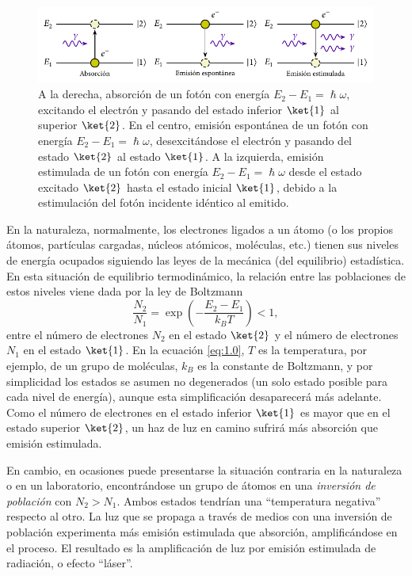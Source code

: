 \begin{figure}[htbp]
  \centering
  \includegraphics[width=\textwidth]{Figuras/ch1_rad_mat.pdf}
  \caption{A la derecha, absorción de un fotón con energía $E_{2} - E_{1} = \hslash \omega$, excitando el electrón y pasando del estado inferior $\ket{1}$ al superior $\ket{2}$. En el centro, emisión espontánea de un fotón con energía $E_{2}-E_{1}=\hslash \omega$, desexcitándose el electrón y pasando del estado $\ket{2}$ al estado $\ket{1}$. A la izquierda, emisión estimulada de un fotón con energía $E_{2}-E_{1}=\hslash \omega$ desde el estado excitado $\ket{2}$ hasta el estado inicial $\ket{1}$, debido a la estimulación del fotón incidente idéntico al emitido.}
  \label{fig:1.2}
\end{figure}

En la naturaleza, normalmente, los electrones ligados a un átomo (o los propios átomos, partículas cargadas, núcleos atómicos, moléculas, etc.) tienen sus niveles de energía ocupados siguiendo las leyes de la mecánica (del equilibrio) estadística. En esta situación de equilibrio termodinámico, la relación entre las poblaciones de estos niveles viene dada por la ley de Boltzmann \autocite{Feynman2011}
\begin{equation}\label{eq:1.0}
  \frac{N_{2}}{N_{1}} = \exp \left(-\frac{E_{2}-E_{1}}{k_{B}T}\right) < 1, 
\end{equation}
entre el número de electrones $N_{2}$ en el estado $\ket{2}$ y el número de electrones $N_{1}$ en el estado $\ket{1}$. En la ecuación \eqref{eq:1.0}, $T$ es la temperatura, por ejemplo, de un grupo de moléculas, $k_{B}$ es la constante de Boltzmann, y por simplicidad los estados se asumen no degenerados (un solo estado posible para cada nivel de energía), aunque esta simplificación desaparecerá más adelante. Como el número de electrones en el estado inferior $\ket{1}$ es mayor que en el estado superior $\ket{2}$, un haz de luz en camino sufrirá más absorción que emisión estimulada.

En cambio, en ocasiones puede presentarse la situación contraria en la naturaleza o en un laboratorio, encontrándose un grupo de átomos en una \emph{inversión de población} con $N_{2} > N_{1}$. Ambos estados tendrían una \enquote{temperatura negativa} respecto al otro. La luz que se propaga a través de medios con una inversión de población experimenta más emisión estimulada que absorción, amplificándose en el proceso. El resultado es la amplificación de luz por emisión estimulada de radiación, o efecto \enquote{láser}.


